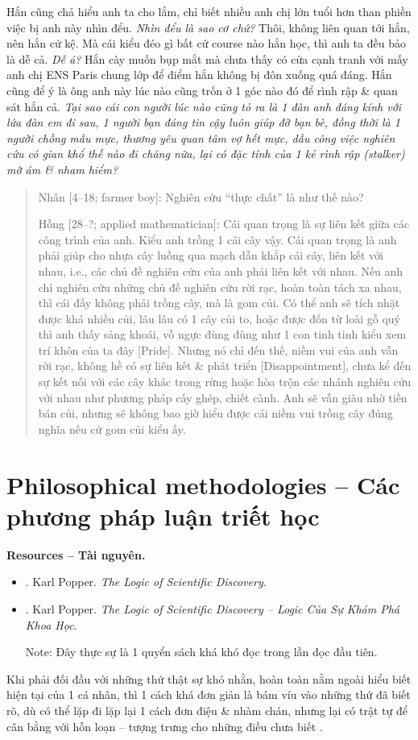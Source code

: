 \documentclass[12pt,oneside]{book}
\begin{document}
Hắn cũng chả hiểu anh ta cho lắm, chỉ biết nhiều anh chị lớn tuổi hơn than phiền việc bị anh này nhìn đểu. {\it Nhìn đểu là sao cơ chứ?} Thôi, không liên quan tới hắn, nên hắn cứ kệ. Mà cái kiểu đéo gì bất cứ course nào hắn học, thì anh ta đều bảo là dễ cả. {\it Dễ á?} Hắn cày muốn bụp mắt mà chưa thấy có cửa cạnh tranh với mấy anh chị ENS Paris chung lớp để điểm hắn không bị đôn xuống quá đáng. Hắn cũng để ý là ông anh này lúc nào cũng trốn ở 1 góc nào đó để rình rập \& quan sát hắn cả. {\it Tại sao cái con người lúc nào cũng tỏ ra là 1 đàn anh đáng kính với lứa đàn em đi sau, 1 người bạn đáng tin cậy luôn giúp đỡ bạn bè, đồng thời là 1 người chồng mẫu mực, thương yêu quan tâm vợ hết mực, dẫu công việc nghiên cứu có gian khổ thế nào đi chăng nữa, lại có đặc tính của 1 kẻ rình rập (stalker) mờ ám \& nham hiểm?}

\begin{quote}
	{\sf Nhân [4--18; farmer boy]}: Nghiên cứu ``thực chất'' là như thế nào?
	
	{\sf Hồng [28--?; applied mathematician]}: Cái quan trọng là sự liên kết giữa các công trình của anh. Kiểu anh trồng 1 cái cây vậy. Cái quan trọng là anh phải giúp cho nhựa cây luồng qua mạch dẫn khắp cái cây, liên kết với nhau, i.e., các chủ đề nghiên cứu của anh phải liên kết với nhau. Nếu anh chỉ nghiên cứu những chủ đề nghiên cứu rời rạc, hoàn toàn tách xa nhau, thì cái đấy không phải trồng cây, mà là gom củi. Có thể anh sẽ tích nhặt được khá nhiều củi, lâu lâu có 1 cây củi to, hoặc được đốn từ loài gỗ quý thì anh thấy sảng khoái, vỗ ngực đùng đùng như 1 con tinh tinh kiểu xem trí khôn của ta đây [{\sc Pride}]. Nhưng nó chỉ đến thế, niềm vui của anh vẫn rời rạc, không hề có sự liên kết \& phát triển [{\sc Disappointment}], chưa kể đến sự kết nối với các cây khác trong rừng hoặc hòa trộn các nhánh nghiên cứu với nhau như phương pháp cấy ghép, chiết cành. Anh sẽ vẫn giàu nhờ tiền bán củi, nhưng sẽ không bao giờ hiểu được cái niềm vui trồng cây đúng nghĩa nếu cứ gom củi kiểu ấy.
\end{quote}

\section{Philosophical methodologies -- Các phương pháp luận triết học}
{\bf \textsf{Resources -- Tài nguyên.}}
\begin{itemize}
	\item \cite{Popper_logic_science}. {\sc Karl Popper}. {\it The Logic of Scientific Discovery}.
	\item \cite{Popper_logic_khoa_hoc}. {\sc Karl Popper}. {\it The Logic of Scientific Discovery -- Logic Của Sự Khám Phá Khoa Học}.
	
	{\sf Note}: Đây thực sự là 1 quyển sách khá khó đọc trong lần đọc đầu tiên.
\end{itemize}
Khi phải đối đầu với những thứ thật sự khó nhằn, hoàn toàn nằm ngoài hiểu biết hiện tại của 1 cá nhân, thì 1 cách khá đơn giản là bám víu vào những thứ đã biết rõ, dù có thể lặp đi lặp lại 1 cách đơn điệu \& nhàm chán, nhưng lại có trật tự để cân bằng với hỗn loạn -- tượng trưng cho những điều chưa biết \cite{Peterson_rule,Peterson_rule_VN,Peterson_beyond_order,Peterson_beyond_order_VN}.
\end{document}
